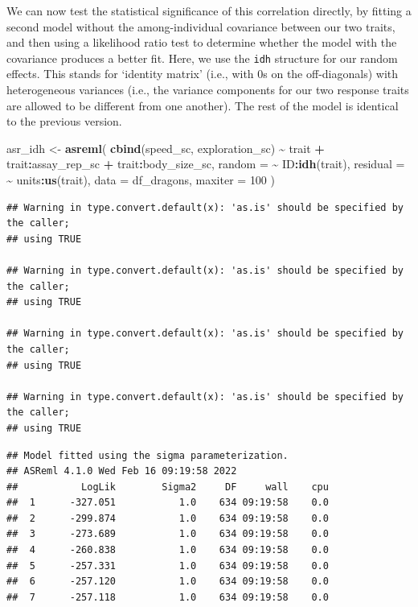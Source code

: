 \documentclass[
  12pt,
]{book}
\newenvironment{Shaded}{\begin{snugshade}}{\end{snugshade}}
\newcommand{\DataTypeTok}[1]{\textcolor[rgb]{0.13,0.29,0.53}{#1}}
\newcommand{\DecValTok}[1]{\textcolor[rgb]{0.00,0.00,0.81}{#1}}
\newcommand{\KeywordTok}[1]{\textcolor[rgb]{0.13,0.29,0.53}{\textbf{#1}}}
\newcommand{\NormalTok}[1]{#1}
\newcommand{\OperatorTok}[1]{\textcolor[rgb]{0.81,0.36,0.00}{\textbf{#1}}}
\newcommand{\StringTok}[1]{\textcolor[rgb]{0.31,0.60,0.02}{#1}}
\begin{document}
We can now test the statistical significance of this correlation directly, by fitting a second model without the among-individual covariance between our two traits, and then using a likelihood ratio test to determine whether the model with the covariance produces a better fit.
Here, we use the \texttt{idh} structure for our random effects. This stands for `identity matrix' (i.e., with 0s on the off-diagonals) with heterogeneous variances (i.e., the variance components for our two response traits are allowed to be different from one another).
The rest of the model is identical to the previous version.

\begin{Shaded}
\begin{Highlighting}[]
\NormalTok{asr\_idh \textless{}{-}}\StringTok{ }\KeywordTok{asreml}\NormalTok{(}
    \KeywordTok{cbind}\NormalTok{(speed\_sc, exploration\_sc) }\OperatorTok{\textasciitilde{}}\StringTok{ }\NormalTok{trait }\OperatorTok{+}
\StringTok{    }\NormalTok{trait}\OperatorTok{:}\NormalTok{assay\_rep\_sc }\OperatorTok{+}\StringTok{ }\NormalTok{trait}\OperatorTok{:}\NormalTok{body\_size\_sc,}
  \DataTypeTok{random =} \OperatorTok{\textasciitilde{}}\StringTok{ }\NormalTok{ID}\OperatorTok{:}\KeywordTok{idh}\NormalTok{(trait),}
  \DataTypeTok{residual =} \OperatorTok{\textasciitilde{}}\StringTok{ }\NormalTok{units}\OperatorTok{:}\KeywordTok{us}\NormalTok{(trait),}
  \DataTypeTok{data =}\NormalTok{ df\_dragons,}
  \DataTypeTok{maxiter =} \DecValTok{100}
\NormalTok{)}
\end{Highlighting}
\end{Shaded}

\begin{verbatim}
## Warning in type.convert.default(x): 'as.is' should be specified by the caller;
## using TRUE

## Warning in type.convert.default(x): 'as.is' should be specified by the caller;
## using TRUE

## Warning in type.convert.default(x): 'as.is' should be specified by the caller;
## using TRUE

## Warning in type.convert.default(x): 'as.is' should be specified by the caller;
## using TRUE
\end{verbatim}

\begin{verbatim}
## Model fitted using the sigma parameterization.
## ASReml 4.1.0 Wed Feb 16 09:19:58 2022
##           LogLik        Sigma2     DF     wall    cpu
##  1      -327.051           1.0    634 09:19:58    0.0
##  2      -299.874           1.0    634 09:19:58    0.0
##  3      -273.689           1.0    634 09:19:58    0.0
##  4      -260.838           1.0    634 09:19:58    0.0
##  5      -257.331           1.0    634 09:19:58    0.0
##  6      -257.120           1.0    634 09:19:58    0.0
##  7      -257.118           1.0    634 09:19:58    0.0
\end{verbatim}
\end{document}

